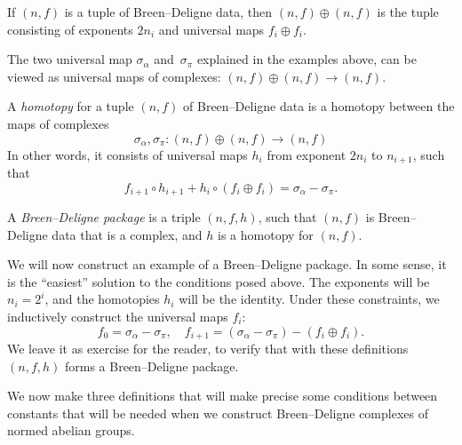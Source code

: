 \begin{definition}
  \label{BD_data_double}
  \leanok
  If $(n, f)$ is a tuple of Breen--Deligne data,
  then $(n, f) \oplus (n, f)$ is the tuple
  consisting of exponents $2n_i$ and universal maps $f_i \oplus f_i$.
\end{definition}

The two universal map $\sigma_\alpha$ and~$\sigma_\pi$ explained in the examples above,
can be viewed as universal maps of complexes: $(n,f) \oplus (n,f) \to (n,f)$.

\begin{definition}
  \label{BD_homotopy}
  \leanok
  A \emph{homotopy} for a tuple $(n, f)$ of Breen--Deligne data
  is a homotopy between the maps of complexes
  \[
    \sigma_\alpha, \sigma_\pi \colon (n,f) \oplus (n,f) \to (n,f)
  \]
  In other words, it consists of universal maps $h_i$ from exponent $2n_i$ to $n_{i+1}$,
  such that
  \[
    f_{i+1} \circ h_{i+1} + h_i \circ (f_i \oplus f_i) = \sigma_\alpha - \sigma_\pi.
  \]
\end{definition}

\begin{definition}
  \label{BD_package}
  \leanok
  A \emph{Breen--Deligne package}
  is a triple $(n, f, h)$,
  such that $(n, f)$ is Breen--Deligne data that is a complex,
  and $h$ is a homotopy for $(n,f)$.
\end{definition}

\begin{definition}
  \label{BD_eg}
  \leanok
  We will now construct an example of a Breen--Deligne package.
  In some sense, it is the ``easiest'' solution to the conditions posed above.
  The exponents will be $n_i = 2^i$, and the homotopies $h_i$ will be the identity.
  Under these constraints, we inductively construct the universal maps $f_i$:
  \[
    f_0 = \sigma_\alpha - \sigma_\pi,
    \quad
    f_{i+1} = (\sigma_\alpha - \sigma_\pi) - (f_i \oplus f_i).
  \]
  We leave it as exercise for the reader, to verify that
  with these definitions $(n, f, h)$ forms a Breen--Deligne package.
\end{definition}

We now make three definitions that will make precise
some conditions between constants that will be needed
when we construct Breen--Deligne complexes of normed abelian groups.

